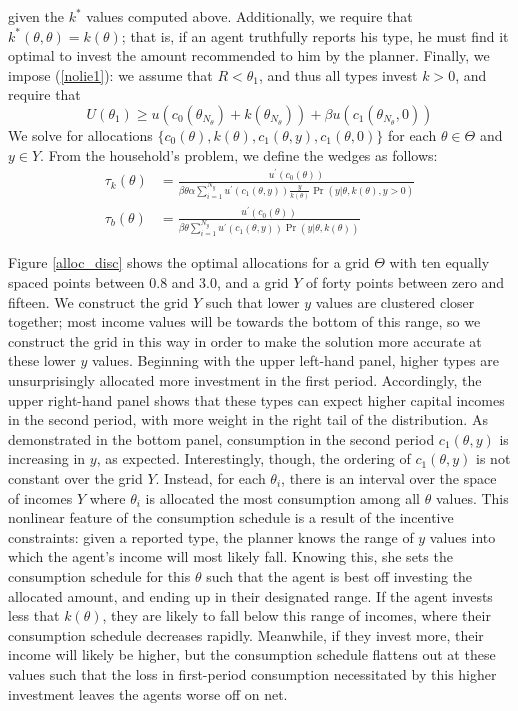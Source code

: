 \documentclass[11pt]{article}
\newcommand{\p}{\prime}
\begin{document}
given the \( k^* \) values computed above. Additionally, we require that \( k^*\left( \theta,\theta \right) = k(\theta) \); that is, if an agent truthfully reports his type, he must find it optimal to invest the amount recommended to him by the planner. Finally, we impose (\ref{nolie1}): we assume that \( R<\theta_1 \), and thus all types invest \( k>0 \), and require that
\begin{equation}
    U(\theta_1)\ge u\left( c_0\left( \theta_{N_\theta} \right) + k\left( \theta_{N_\theta} \right) \right) + \beta u\left( c_1\left( \theta_{N_\theta},0 \right) \right) \label{nolie_disc}
\end{equation}
We solve for allocations \( \{c_0(\theta), k(\theta), c_1(\theta,y),c_1(\theta,0)\} \) for each \( \theta\in\Theta \) and \( y\in Y \). From the household's problem, we define the wedges as follows:
\begin{align*}
    \tau_k(\theta) &= \frac{u^\p(c_0(\theta))}{\beta\theta\alpha \sum_{i=1}^{N_y}u^\p(c_1(\theta,y))\frac{y}{k(\theta)}\Pr\left( y|\theta,k(\theta),y>0 \right)} \\
    \tau_b(\theta) &= \frac{u^\p(c_0(\theta))}{\beta\theta \sum_{i=1}^{N_y}u^\p(c_1(\theta,y))\Pr\left( y|\theta,k(\theta) \right)}
\end{align*}

Figure \ref{alloc_disc} shows the optimal allocations for a grid \( \Theta \) with ten equally spaced points between 0.8 and 3.0, and a grid \( Y \) of forty points between zero and fifteen. We construct the grid \( Y \) such that lower \( y \) values are clustered closer together; most income values will be towards the bottom of this range, so we construct the grid in this way in order to make the solution more accurate at these lower \( y \) values. Beginning with the upper left-hand panel, higher types are unsurprisingly allocated more investment in the first period. Accordingly, the upper right-hand panel shows that these types can expect higher capital incomes in the second period, with more weight in the right tail of the distribution. As demonstrated in the bottom panel, consumption in the second period \( c_1(\theta,y) \) is increasing in \( y \), as expected. Interestingly, though, the ordering of \( c_1(\theta,y) \) is not constant over the grid \( Y \). Instead, for each \( \theta_i \), there is an interval over the space of incomes \( Y \) where \( \theta_i \) is allocated the most consumption among all \( \theta \) values. This nonlinear feature of the consumption schedule is a result of the incentive constraints: given a reported type, the planner knows the range of \( y \) values into which the agent's income will most likely fall. Knowing this, she sets the consumption schedule for this \( \theta \) such that the agent is best off investing the allocated amount, and ending up in their designated range. If the agent invests less that \( k(\theta) \), they are likely to fall below this range of incomes, where their consumption schedule decreases rapidly. Meanwhile, if they invest more, their income will likely be higher, but the consumption schedule flattens out at these values such that the loss in first-period consumption necessitated by this higher investment leaves the agents worse off on net. 
\end{document}

